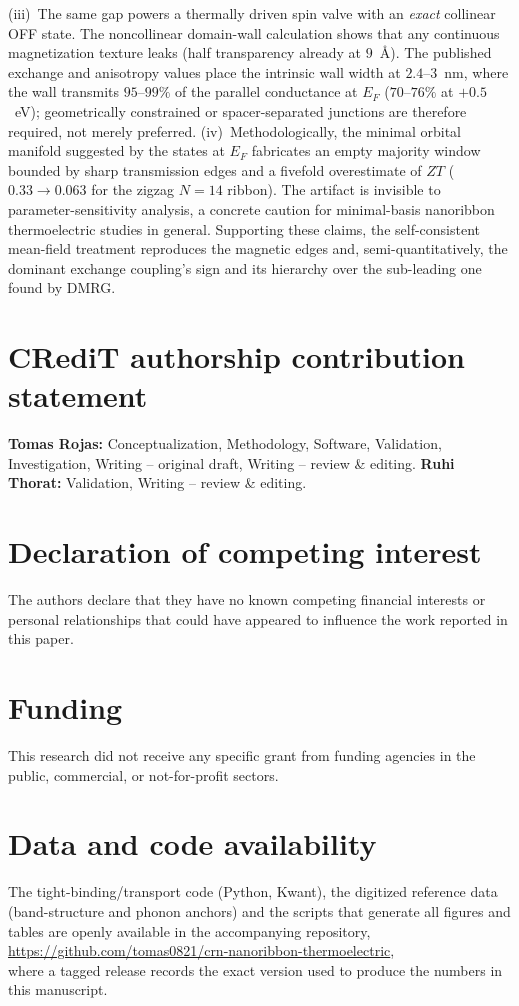 \documentclass[preprint,12pt]{elsarticle}
\begin{document}
(iii)~The same gap powers a thermally driven spin valve with an \emph{exact} collinear OFF
state. The noncollinear domain-wall calculation shows that any continuous magnetization
texture leaks (half transparency already at $9$~\AA). The published exchange and
anisotropy values place the intrinsic wall width at $2.4$--$3$~nm, where the wall transmits
$95$--$99\%$ of the parallel conductance at $E_F$ ($70$--$76\%$ at $+0.5$~eV);
geometrically constrained or spacer-separated junctions are therefore required, not merely preferred. (iv)~Methodologically, the minimal
orbital manifold suggested by the states at $E_F$ fabricates an empty majority window bounded
by sharp transmission edges and a fivefold overestimate of $ZT$ ($0.33\to0.063$ for the zigzag $N=14$ ribbon). The
artifact is invisible to parameter-sensitivity analysis, a concrete caution for minimal-basis
nanoribbon thermoelectric studies in general. Supporting these claims, the self-consistent
mean-field treatment reproduces the magnetic edges and, semi-quantitatively, the dominant
exchange coupling's sign and its hierarchy over the sub-leading one found by DMRG.

\section*{CRediT authorship contribution statement}
\textbf{Tomas Rojas:} Conceptualization, Methodology, Software, Validation, Investigation,
Writing -- original draft, Writing -- review \& editing. \textbf{Ruhi Thorat:} Validation,
Writing -- review \& editing.

\section*{Declaration of competing interest}
The authors declare that they have no known competing financial interests or personal
relationships that could have appeared to influence the work reported in this paper.

\section*{Funding}
This research did not receive any specific grant from funding agencies in the public,
commercial, or not-for-profit sectors.

\section*{Data and code availability}
The tight-binding/transport code (Python, Kwant), the digitized reference data (band-structure
and phonon anchors) and the scripts that generate all figures and tables are openly available
in the accompanying repository,\\
\url{https://github.com/tomas0821/crn-nanoribbon-thermoelectric},\\
where a tagged release records the exact version used to produce the numbers in this
manuscript.
\end{document}
